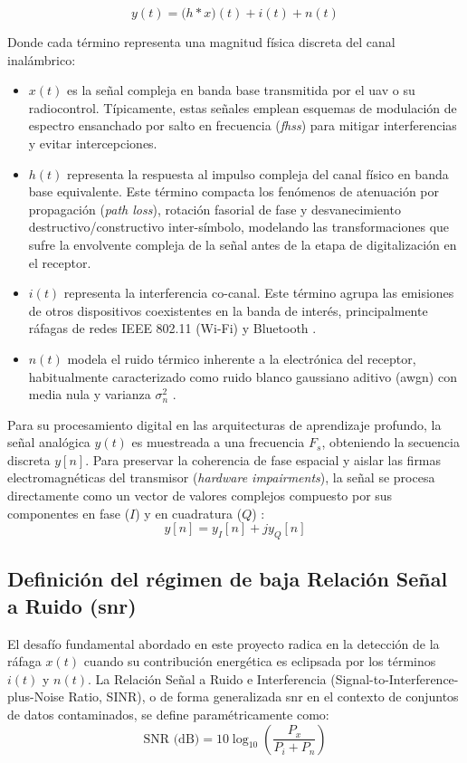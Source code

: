 \begin{equation}
    y(t) = \big(h * x\big)(t) + i(t) + n(t)
    \label{eq:modelo_sistema}
\end{equation}

Donde cada término representa una magnitud física discreta del canal inalámbrico:
\begin{itemize}
    \item $x(t)$ es la señal compleja en banda base transmitida por el \gls{uav} o su radiocontrol. Típicamente, estas señales emplean esquemas de modulación de espectro ensanchado por salto en frecuencia (\textit{\gls{fhss}}) para mitigar interferencias y evitar intercepciones.
    \item $h(t)$ representa la respuesta al impulso compleja del canal físico en banda base equivalente. Este término compacta los fenómenos de atenuación por propagación (\textit{path loss}), rotación fasorial de fase y desvanecimiento destructivo/constructivo inter-símbolo, modelando las transformaciones que sufre la envolvente compleja de la señal antes de la etapa de digitalización en el receptor.
    \item $i(t)$ representa la interferencia co-canal. Este término agrupa las emisiones de otros dispositivos coexistentes en la banda de interés, principalmente ráfagas de redes IEEE 802.11 (Wi-Fi) y Bluetooth \cite{ezuma_detection_2020}.
    \item $n(t)$ modela el ruido térmico inherente a la electrónica del receptor, habitualmente caracterizado como ruido blanco gaussiano aditivo (\gls{awgn}) con media nula y varianza $\sigma_n^2$ \cite{lacy_machine_2024}.
\end{itemize}

Para su procesamiento digital en las arquitecturas de aprendizaje profundo, la señal analógica $y(t)$ es muestreada a una frecuencia $F_s$, obteniendo la secuencia discreta $y[n]$. Para preservar la coherencia de fase espacial y aislar las firmas electromagnéticas del transmisor (\textit{hardware impairments}), la señal se procesa directamente como un vector de valores complejos compuesto por sus componentes en fase ($I$) y en cuadratura ($Q$) \cite{valkama_blind_2005, zheng_deep_2025}:
\begin{equation}
    y[n] = y_I[n] + j y_Q[n]
    \label{eq:iq_discreta}
\end{equation}

\subsection{Definición del régimen de baja Relación Señal a Ruido (\gls{snr})}
El desafío fundamental abordado en este proyecto radica en la detección de la ráfaga $x(t)$ cuando su contribución energética es eclipsada por los términos $i(t)$ y $n(t)$. La Relación Señal a Ruido e Interferencia (Signal-to-Interference-plus-Noise Ratio, SINR), o de forma generalizada \gls{snr} en el contexto de conjuntos de datos contaminados, se define paramétricamente como:
\begin{equation}
    \text{SNR (dB)} = 10 \log_{10} \left( \frac{P_x}{P_i + P_n} \right)
    \label{eq:snr_calculo}
\end{equation}

